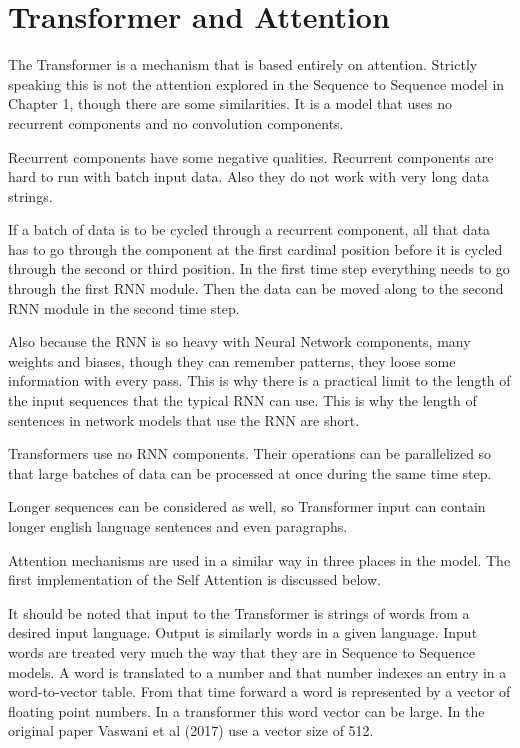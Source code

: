 
\section{Transformer and Attention}

The Transformer is a mechanism that is based entirely on attention. Strictly speaking this is not the attention explored in the Sequence to Sequence model in Chapter 1, though there are some similarities. It is a model that uses no recurrent components and no convolution components. 

Recurrent components have some negative qualities. Recurrent components are hard to run with batch input data. Also they do not work with very long data strings. 

If a batch of data is to be cycled through a recurrent component, all that data has to go through the component at the first cardinal position before it is cycled through the second or third position. In the first time step everything needs to go through the first RNN module. Then the data can be moved along to the second RNN  module in the second time step.

Also because the RNN is so heavy with Neural Network components, many weights and biases, though they can remember patterns, they loose some information with every pass. This is why there is a practical limit to the length of the input sequences that the typical RNN can use. This is why the length of sentences in network models that use the RNN are short.

Transformers use no RNN components. Their operations can be parallelized so that large batches of data can be processed at once during the same time step. 

Longer sequences can be considered as well, so Transformer input can contain longer english language sentences and even paragraphs.

Attention mechanisms are used in a similar way in three places in the model. The first implementation of the Self Attention is discussed below.

It should be noted that input to the Transformer is strings of words from a desired input language. Output is similarly words in a given language. Input words are treated very much the way that they are in Sequence to Sequence models. A word is translated to a number and that number indexes an entry in a word-to-vector table. From that time forward a word is represented by a vector of floating point numbers. In a transformer this word vector can be large. In the original paper Vaswani et al (2017)\cite{Vaswani2017AttentionIA} use a vector size of 512. 

